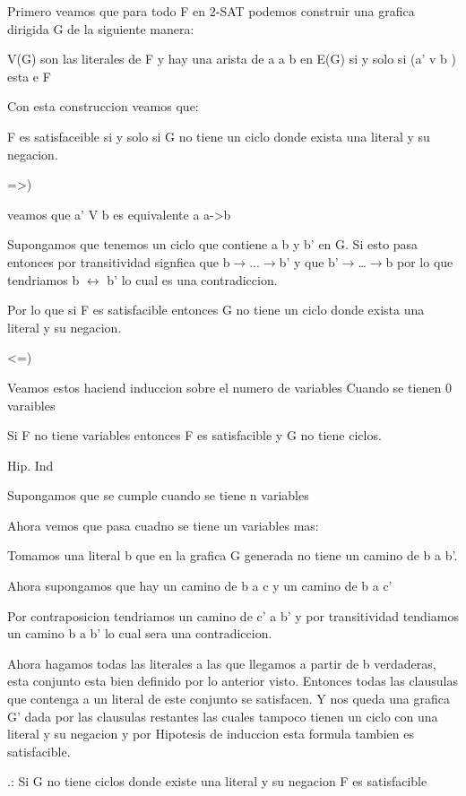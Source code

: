 \documentclass[12pt]{article}
\begin{document}
Primero veamos que para todo F en 2-SAT podemos construir una grafica dirigida G de la siguiente manera:

	V(G) son las literales de F y hay una arista de a a b en E(G) si y solo si (a’ v b ) esta e F 

Con esta construccion veamos que:

	 F es satisfaceible si y solo si G no tiene un ciclo donde exista una literal y su negacion.

=>)

veamos que a’ V b es equivalente a a->b

Supongamos que tenemos un ciclo que contiene a b y b’ en G. 
Si esto pasa entonces por transitividad signfica que b$\rightarrow$...$\rightarrow$b’ y que b’$\rightarrow$…$\rightarrow$b por lo que tendriamos  b $\leftrightarrow$ b’ lo cual es una contradiccion.

Por lo que si F es satisfacible entonces G no tiene un ciclo donde exista una literal y su negacion.

<=)

Veamos estos haciend induccion sobre el numero de variables 
Cuando se tienen 0 varaibles

Si F no tiene variables entonces F es satisfacible y G no tiene ciclos.

Hip. Ind

Supongamos que se cumple cuando se tiene n variables

Ahora vemos que pasa cuadno se tiene un variables mas:

Tomamos una literal b que en la grafica G generada no tiene un camino de b a b’.

Ahora supongamos que hay un camino de b a c y un camino de b a c’

Por contraposicion tendriamos un camino de c’ a b’ y por transitividad tendiamos un camino  b a b’ lo cual sera una contradiccion.

Ahora hagamos todas las literales  a las que llegamos a partir de b verdaderas, esta conjunto esta bien definido por lo anterior visto. Entonces todas las clausulas que contenga a un literal de este conjunto se satisfacen. Y nos queda una grafica G’ dada por las clausulas restantes las cuales tampoco tienen un ciclo con una literal y su negacion y por Hipotesis de induccion esta formula tambien es satisfacible.

.: Si G no tiene ciclos donde existe una literal y su negacion F es satisfacible
\end{document}
